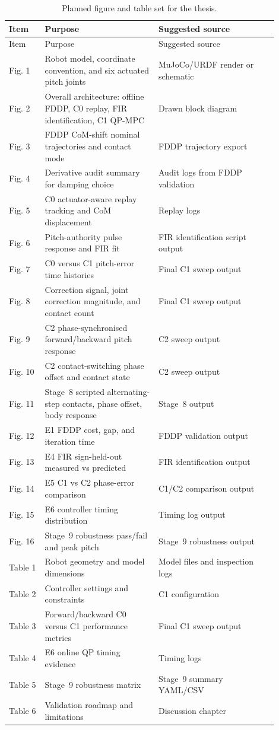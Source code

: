 \documentclass[12pt,a4paper]{report}
\begin{document}
\begin{longtable}{@{}p{0.12\linewidth}p{0.38\linewidth}p{0.40\linewidth}@{}}
\caption{Planned figure and table set for the thesis.}\label{tab:figure_table_plan}\\
\toprule
Item & Purpose & Suggested source \\
\midrule
\endfirsthead
\toprule
Item & Purpose & Suggested source \\
\midrule
\endhead
Fig. 1 & Robot model, coordinate convention, and six actuated pitch joints & MuJoCo/URDF render or schematic \\
Fig. 2 & Overall architecture: offline FDDP, C0 replay, FIR identification, C1 QP-MPC & Drawn block diagram \\
Fig. 3 & FDDP CoM-shift nominal trajectories and contact mode & FDDP trajectory export \\
Fig. 4 & Derivative audit summary for damping choice & Audit logs from FDDP validation \\
Fig. 5 & C0 actuator-aware replay tracking and CoM displacement & Replay logs \\
Fig. 6 & Pitch-authority pulse response and FIR fit & FIR identification script output \\
Fig. 7 & C0 versus C1 pitch-error time histories & Final C1 sweep output \\
Fig. 8 & Correction signal, joint correction magnitude, and contact count & Final C1 sweep output \\
Fig. 9 & C2 phase-synchronised forward/backward pitch response & C2 sweep output \\
Fig. 10 & C2 contact-switching phase offset and contact state & C2 sweep output \\
Fig. 11 & Stage~8 scripted alternating-step contacts, phase offset, body response & Stage~8 output \\
Fig. 12 & E1 FDDP cost, gap, and iteration time & FDDP validation output \\
Fig. 13 & E4 FIR sign-held-out measured vs predicted & FIR identification output \\
Fig. 14 & E5 C1 vs C2 phase-error comparison & C1/C2 comparison output \\
Fig. 15 & E6 controller timing distribution & Timing log output \\
Fig. 16 & Stage~9 robustness pass/fail and peak pitch & Stage~9 robustness output \\
Table 1 & Robot geometry and model dimensions & Model files and inspection logs \\
Table 2 & Controller settings and constraints & C1 configuration \\
Table 3 & Forward/backward C0 versus C1 performance metrics & Final C1 sweep output \\
Table 4 & E6 online QP timing evidence & Timing logs \\
Table 5 & Stage~9 robustness matrix & Stage~9 summary YAML/CSV \\
Table 6 & Validation roadmap and limitations & Discussion chapter \\
\bottomrule
\end{longtable}
 
\clearpage


 
\end{document}
